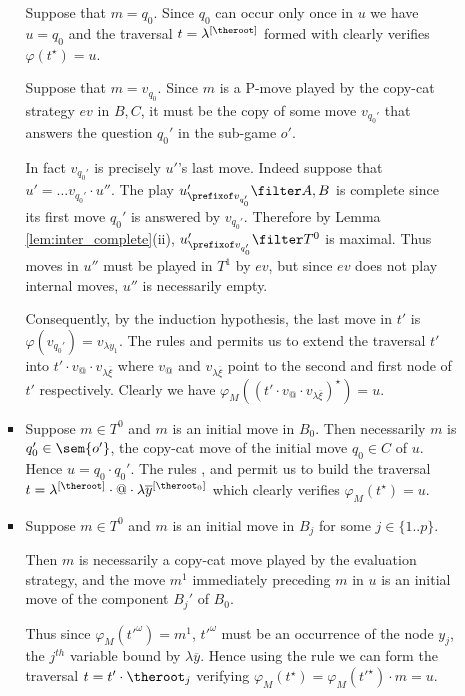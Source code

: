 \begin{enumerate}[$\bullet$]
\begin{enumerate}
\begin{itemize}
    Suppose that $m=q_0$. Since $q_0$ can occur only once in
    $u$ we have $u=q_0$ and the traversal $t=\lambda^{[\theroot]}$ formed with  clearly verifies $\varphi(t^\star) = u$.

    Suppose that $m=v_{q_0}$. Since $m$ is a P-move played by the
    copy-cat strategy $ev$ in $B,C$, it must be the copy of some move $v_{q_0'}$ that answers the question $q_0'$ in the sub-game $o'$.

    In fact $v_{q_0'}$ is precisely $u'$'s last move. Indeed
    suppose that $u' = \ldots v_{q_0'} \cdot u''$. The play
    $u'_{\prefixof v_{q_0'}}\filter A,B$ is complete since its
    first move $q_0'$ is answered by $v_{q_0'}$. Therefore by
    Lemma \ref{lem:inter_complete}(ii), $u'_{\prefixof
    v_{q_0'}}\filter T^0$ is maximal. Thus moves in $u''$ must
    be played in $T^1$ by $ev$, but since $ev$ does not play internal
    moves, $u''$ is necessarily empty.

    Consequently, by the induction hypothesis, the last move in $t'$ is $\varphi(v_{q_0'}) = v_{\lambda y_1}$.
    The rules  and  permits us to extend
    the traversal $t'$ into $t' \cdot v_@ \cdot v_{\lambda \overline{\xi}}$ where $v_@$ and $v_{\lambda
    \overline{\xi}}$ point to the second and first node of $t'$ respectively. Clearly we have $\varphi_M((t'\cdot v_@ \cdot v_{\lambda \overline{\xi}})^\star) = u$.

    \item Suppose $m\in T^0$ and $m$ is an initial move in $B_0$.
    Then necessarily $m$ is $q_0' \in \sem{o'}$, the copy-cat move of the initial move $q_0 \in C$ of $u$. Hence $u = q_0 \cdot q_0'$. The rules , 
and  permit us to build the traversal $t =
\lambda^{[\theroot]} \cdot @ \cdot \lambda
\overline{y}^{[\theroot_0]}$ which clearly verifies
$\varphi_M(t^\star) = u$.

    \item Suppose $m\in T^0$ and $m$ is an initial move in $B_j$ for some $j\in \{1..p\}$.

    Then $m$ is necessarily a copy-cat move played by the evaluation strategy, and the move $m^1$ immediately preceding $m$ in $u$
is an initial move of the component $B_j'$ of $B_0$.

Thus since $\varphi_M(t'^\omega) = m^1$, $t'^\omega$ must be an occurrence of the node $y_j$, the $j^{th}$ variable bound by
$\lambda \overline{y}$. Hence using the rule  we can form the traversal $t= t' \cdot \theroot_j$ verifying
$\varphi_M(t^\star) = \varphi_M(t'^\star) \cdot m = u$.



\end{itemize}
\end{enumerate}
\end{enumerate}
